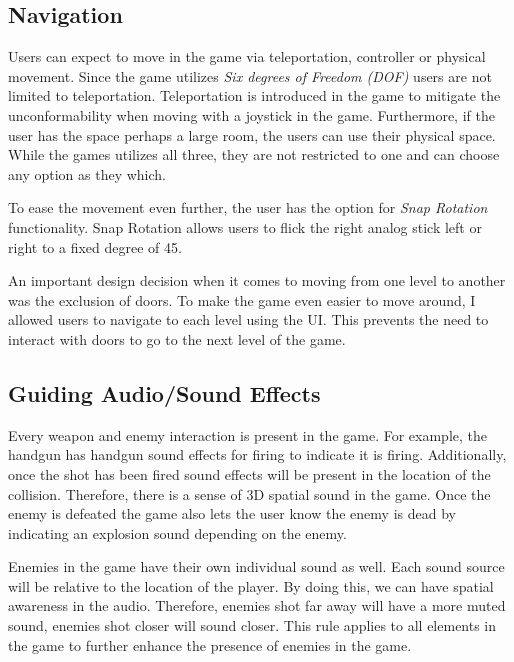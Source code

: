\documentclass[12pt, twoside]{article}
\begin{document}
\subsection{Navigation}
Users can expect to move in the game via teleportation, controller or physical
movement. Since the game utilizes \emph{Six degrees of Freedom (DOF)} users are
not limited to teleportation. Teleportation is introduced in the game to
mitigate the unconformability when moving with a joystick in the game.
Furthermore, if the user has the space perhaps a large room, the users can use
their physical space. While the games utilizes all three, they are not
restricted to one and can choose any option as they which.\par 

To ease the movement even further, the user has the option for \emph{Snap
Rotation} functionality. Snap Rotation allows users to flick the right analog
stick left or right to a fixed degree of 45\textdegree.\par

An important design decision when it comes to moving from one level to another
was the exclusion of doors. To make the game even easier to move around, I
allowed users to navigate to each level using the UI. This prevents the need to
interact with doors to go to the next level of the game.



\subsection{Guiding Audio/Sound Effects}
Every weapon and enemy interaction is present in the game. For example, the
handgun has handgun sound effects for firing to indicate it is firing.
Additionally, once the shot has been fired sound effects will be present in the
location of the collision. Therefore, there is a sense of 3D spatial sound in the
game. Once the enemy is defeated the game also lets the user know the enemy is
dead by indicating an explosion sound depending on the enemy. \par

Enemies in the game have their own individual sound as well. Each sound source
will be relative to the location of the player. By doing this, we can have
spatial awareness in the audio. Therefore, enemies shot far away will have a
more muted sound, enemies shot closer will sound closer. This rule applies to
all elements in the game to further enhance the presence of enemies in the
game.\par 
\end{document}
